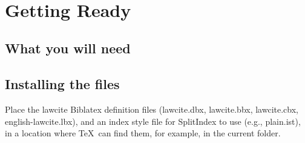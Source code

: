 



\newcommand\optsett[2]{\noindent\textcolor{blue}{\texttt{#1} \ifblank{#2}{}{\hfill default: \texttt{\textbf{#2}}}}}

\newcommand\bcmd[1]{\{#1\}}
\newcommand\cmd[1]{\texttt{\textcolor{blue}{\textbackslash #1}}}
\newcommand\cmdb[1]{\texttt{\textbackslash #1}}
\newcommand\cmdc[1]{\texttt{\textcolor{blue}{#1}}}
\newcommand\mcmd[1]{\texttt{\textbackslash #1\{\}}}
\newcommand\braces[1]{\{#1\}}
\newcommand\brackets[1]{[#1]}
\newcommand\parens[1]{(#1)}
\newcommand\disp[1]{\hfill\fbox{#1}\hfill\ \par}
\newcommand\dispb[1]{\hfill #1 \hfill\ \par\medskip}
\newcommand\dispeg[1]{\noindent #1\par}


\newcommand\canreg[2]{\lawcite[#2]{#1}}

\newfontface{}
\newcommand\attribution[1]{\hspace{2pt}\fcc\tiny\rotatebox{90}{#1}}


\usepackage[
				final=true,
				bookmarks,
            colorlinks=true,        
            allcolors = black,  
            citecolor=blue, 
            hyperindex=false,       
]{hyperref}




\maketitle
\begin{abstract}
\myabstracttext
\end{abstract}
\newpage
\tableofcontents
\bigskip
\hfill{}\hfill\ %
\bigskip
\hfill{}\hfill\ %
\bigskip
\section{Getting Ready}
\subsection{What you will need}
\subsection{Installing the files}
Place the lawcite Biblatex definition files (lawcite.dbx, lawcite.bbx, lawcite.cbx, english-lawcite.lbx), and an index style file for SplitIndex to use (e.g., plain.ist), in a location where \TeX\ can find them, for example, in the current folder.

